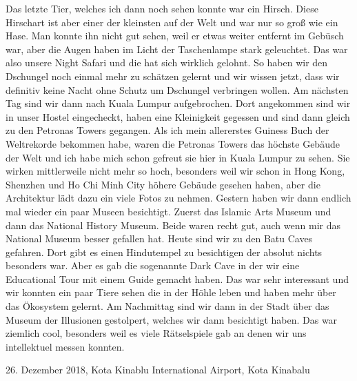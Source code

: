 \documentclass[11pt]{book}
\begin{document}
Das letzte Tier, welches ich dann noch sehen konnte war ein Hirsch. Diese Hirschart ist aber einer der kleinsten auf der Welt und 
war nur so groß wie ein Hase. Man konnte ihn nicht gut sehen, weil er etwas weiter entfernt im Gebüsch war, aber die Augen haben 
im Licht der Taschenlampe stark geleuchtet. Das war also unsere Night Safari und die hat sich wirklich gelohnt. So haben wir den 
Dschungel noch einmal mehr zu schätzen gelernt und wir wissen jetzt, dass wir definitiv keine Nacht ohne Schutz um Dschungel verbringen 
wollen.
Am nächsten Tag sind wir dann nach Kuala Lumpur aufgebrochen. Dort angekommen sind wir in unser Hostel eingecheckt, haben eine Kleinigkeit 
gegessen und sind dann gleich zu den Petronas Towers gegangen. Als ich mein allererstes Guiness Buch der Weltrekorde bekommen habe, 
waren die Petronas Towers das höchste Gebäude der Welt und ich habe mich schon gefreut sie hier in Kuala Lumpur zu sehen. Sie wirken 
mittlerweile nicht mehr so hoch, besonders weil wir schon in Hong Kong, Shenzhen und Ho Chi Minh City höhere Gebäude gesehen haben, aber 
die Architektur lädt dazu ein viele Fotos zu nehmen. Gestern haben wir dann endlich mal wieder ein paar Museen besichtigt. Zuerst das 
Islamic Arts Museum und dann das National History Museum. Beide waren recht gut, auch wenn mir das National Museum besser gefallen hat.
Heute sind wir zu den Batu Caves gefahren. Dort gibt es einen Hindutempel zu besichtigen der absolut nichts besonders war. Aber es 
gab die sogenannte Dark Cave in der wir eine Educational Tour mit einem Guide gemacht haben. Das war sehr interessant und wir konnten 
ein paar Tiere sehen die in der Höhle leben und haben mehr über das Ökosystem gelernt. Am Nachmittag sind wir dann in der Stadt über 
das Museum der Illusionen gestolpert, welches wir dann besichtigt haben. Das war ziemlich cool, besonders weil es viele Rätselspiele 
gab an denen wir uns intellektuel messen konnten.

26. Dezember 2018, Kota Kinablu International Airport, Kota Kinabalu
\end{document}
